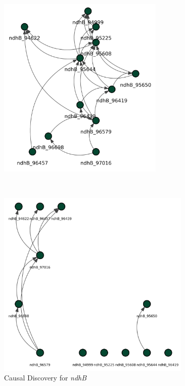 \documentclass[
]{article}
\theoremstyle{definition}
\theoremstyle{remark}
\begin{document}
\begin{figure}[H]
\begin{minipage}{0.43\linewidth}
\includegraphics[width=3.125in,height=\textheight,keepaspectratio]{Figures Causal Discovery/DAG_LiNGAM_ndhB.png}

\end{minipage}%
%
\begin{minipage}{0.13\linewidth}
~\end{minipage}%
%
\begin{minipage}{0.43\linewidth}

\includegraphics[width=3.64583in,height=\textheight,keepaspectratio]{Figures Causal Discovery/DAG_NOTEARS_ndhB.png}

\end{minipage}%

\caption{\label{fig-CD_ndhB}Causal Discovery for \emph{ndhB}}

\end{figure}%
\end{document}
